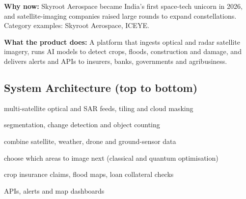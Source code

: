 \documentclass[10pt,a4paper]{article}
\begin{document}
\begin{tcolorbox}[colback=l1bg,colframe=l1bg,arc=2pt,borderline west={3pt}{0pt}{saffron},top=2pt,bottom=2pt]\small\textbf{Why now:} Skyroot Aerospace became India's first space-tech unicorn in 2026, and satellite-imaging companies raised large rounds to expand constellations. {\color{muted}Category examples: Skyroot Aerospace, ICEYE.}\end{tcolorbox}
\begin{tcolorbox}[colback=l3bg,colframe=l3bg,arc=2pt,borderline west={3pt}{0pt}{igreen},top=2pt,bottom=2pt]\small\textbf{What the product does:} A platform that ingests optical and radar satellite imagery, runs AI models to detect crops, floods, construction and damage, and delivers alerts and APIs to insurers, banks, governments and agribusiness.\end{tcolorbox}
\subsection*{System Architecture (top to bottom)}
\begin{tcolorbox}[colback=lay0,colframe=lay0,arc=2pt,top=1.5pt,bottom=1.5pt,left=6pt,before skip=2pt,after skip=2pt]\small{} multi-satellite optical and SAR feeds, tiling and cloud masking\end{tcolorbox}
\begin{tcolorbox}[colback=lay1,colframe=lay1,arc=2pt,top=1.5pt,bottom=1.5pt,left=6pt,before skip=2pt,after skip=2pt]\small{} segmentation, change detection and object counting\end{tcolorbox}
\begin{tcolorbox}[colback=lay2,colframe=lay2,arc=2pt,top=1.5pt,bottom=1.5pt,left=6pt,before skip=2pt,after skip=2pt]\small{} combine satellite, weather, drone and ground-sensor data\end{tcolorbox}
\begin{tcolorbox}[colback=lay3,colframe=lay3,arc=2pt,top=1.5pt,bottom=1.5pt,left=6pt,before skip=2pt,after skip=2pt]\small{} choose which areas to image next (classical and quantum optimisation)\end{tcolorbox}
\begin{tcolorbox}[colback=lay4,colframe=lay4,arc=2pt,top=1.5pt,bottom=1.5pt,left=6pt,before skip=2pt,after skip=2pt]\small{} crop insurance claims, flood maps, loan collateral checks\end{tcolorbox}
\begin{tcolorbox}[colback=lay5,colframe=lay5,arc=2pt,top=1.5pt,bottom=1.5pt,left=6pt,before skip=2pt,after skip=2pt]\small{} APIs, alerts and map dashboards\end{tcolorbox}
\end{document}

